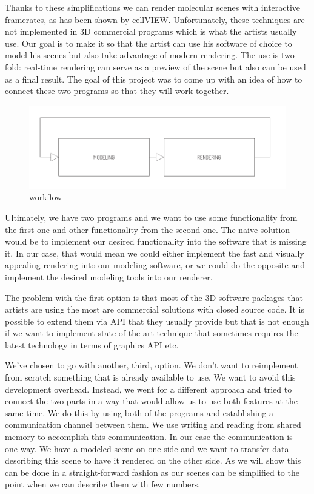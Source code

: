 \documentclass[
  digital, %
  table,   %
  nolof,     %
  nolot,     %
]{fithesis3}
\begin{document}
Thanks to these simplifications we can render molecular scenes with interactive framerates, as has been shown by cellVIEW\cite{cellVIEW_2015}. Unfortunately, these techniques are not implemented in 3D commercial programs which is what the artists usually use. Our goal is to make it so that the artist can use his software of choice to model his scenes but also take advantage of modern rendering. The use is two-fold: real-time rendering can serve as a preview of the scene but also can be used as a final result. The goal of this project was to come up with an idea of how to connect these two programs so that they will work together.

\begin{figure}
  \centering
  \includegraphics[scale=0.8]{images/pipeline.pdf}
  \caption{workflow}
  \label{fig:workflow}
\end{figure}

Ultimately, we have two programs and we want to use some functionality from the first one and other functionality from the second one. The naive solution would be to implement our desired functionality into the software that is missing it. In our case, that would mean we could either implement the fast and visually appealing rendering into our modeling software, or we could do the opposite and implement the desired modeling tools into our renderer.

The problem with the first option is that most of the 3D software packages that artists are using the most are commercial solutions with closed source code. It is possible to extend them via API that they usually provide but that is not enough if we want to implement state-of-the-art technique that sometimes requires the latest technology in terms of graphics API etc.

We've chosen to go with another, third, option. We don't want to reimplement from scratch something that is already available to use. We want to avoid this development overhead. Instead, we went for a different approach and tried to connect the two parts in a way that would allow us to use both features at the same time. We do this by using both of the programs and establishing a communication channel between them. We use writing and reading from shared memory to accomplish this communication. In our case the communication is one-way. We have a modeled scene on one side and we want to transfer data describing this scene to have it rendered on the other side. As we will show this can be done in a straight-forward fashion as our scenes can be simplified to the point when we can describe them with few numbers.
\end{document}
